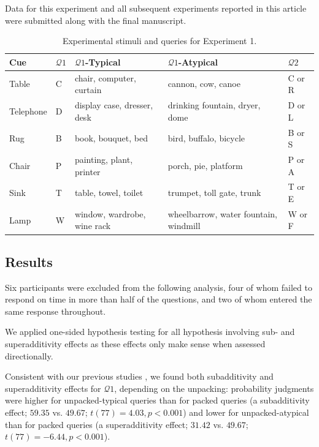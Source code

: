 Data for this experiment and all subsequent experiments reported in this article were submitted along with the final manuscript.

\begin{table}
\caption{Experimental stimuli and queries for Experiment 1.}
\label{tab:scenarios}
\centering
\begin{tabular}{p{} p{} >{\raggedright}p{} >{\raggedright}p{} p{}}
  \toprule

\bf{Cue} & \bf{$\mathcal{Q}1$} & \bf{$\mathcal{Q}1$-Typical} & \bf{$\mathcal{Q}1$-Atypical}& \bf{$\mathcal{Q}2$}\tabularnewline

\midrule
Table & C & chair, computer, curtain & cannon, cow, canoe & C or R\tabularnewline

Telephone & D & display case, dresser, desk & drinking fountain, dryer, dome & D or L\tabularnewline

Rug & B & book, bouquet, bed & bird, buffalo, bicycle & B or S\tabularnewline

Chair & P & painting, plant, printer & porch, pie, platform & P or A\tabularnewline

Sink & T & table, towel, toilet & trumpet, toll gate, trunk &T or E\tabularnewline

Lamp & W & window, wardrobe, wine rack & wheelbarrow, water fountain, windmill & W or F \tabularnewline
\bottomrule
\end{tabular}
\end{table}

\subsection{Results}

Six participants were excluded from the following analysis, four of whom failed to respond on time in more than half of the questions, and two of whom entered the same response throughout.

We applied one-sided hypothesis testing for all hypothesis involving sub- and superadditivity effects as these effects only make sense when assessed directionally.

Consistent with our previous studies \citep{dasgupta17}, we found both subadditivity and superadditivity effects for $\mathcal{Q}1$, depending on the unpacking: probability judgments were higher for unpacked-typical queries than for packed queries (a subadditivity effect; $59.35$ vs. $49.67$; $t(77)= 4.03, p<0.001$) and lower for unpacked-atypical than for packed queries (a superadditivity effect; $31.42$ vs. $49.67$; $t(77)= -6.44, p<0.001$).

